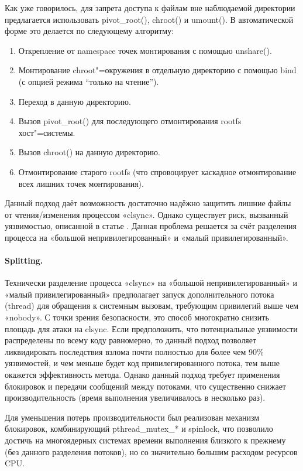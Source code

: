 \documentclass[10pt, a5paper]{article}
\begin{document}
Как уже говорилось, для запрета доступа к файлам вне наблюдаемой директории предлагается использовать pivot\_root(), chroot() и umount(). В автоматической форме это делается по следующему алгоритму:

\begin{enumerate}
  \item Открепление от namespace точек монтирования с помощью unshare().
  \item Монтирование chroot"=окружения в отдельную директорию с помощью bind (с опцией режима ``только на чтение'').
  \item Переход в данную директорию.
  \item Вызов pivot\_root() для последующего отмонтирования rootfs хост"=системы.
  \item Вызов chroot() на данную директорию.
  \item Отмонтирование старого rootfs (что спровоцирует каскадное отмонтирование всех лишних точек монтирования).
\end{enumerate}

Данный подход даёт возможность достаточно надёжно защитить лишние файлы от чтения/изменения процессом «clsync». Однако существует риск, вызванный уязвимостью, описанной в статье \cite{Okunev10}. Данная проблема решается за счёт разделения процесса на «большой непривилегированный» и «малый привилегированный».

\paragraph{Splitting.}

Технически разделение процесса «clsync» на «большой непривилегированный» и «малый привилегированный» предполагает запуск дополнительного потока (thread) для обращения к системным вызовам, требующим привилегий выше чем «nobody». С точки зрения безопасности, это способ многократно снизить площадь для атаки на clsync. Если предположить, что потенциальные уязвимости распределены по всему коду равномерно, то данный подход позволяет ликвидировать последствия взлома почти полностью для более чем 90\% уязвимостей, и чем меньше будет код привилегированного потока, тем выше окажется эффективность метода. Однако данный подход требует применения блокировок и передачи сообщений между потоками, что существенно снижает производительность (время выполнения увеличивалось в несколько раз).

Для уменьшения потерь производительности был реализован механизм блокировок, комбинирующий pthread\_mutex\_* и spinlock, что позволило достичь на многоядерных системах времени выполнения близкого к прежнему (без данного разделения потоков), но со значительно большим расходом ресурсов CPU.
\end{document}

